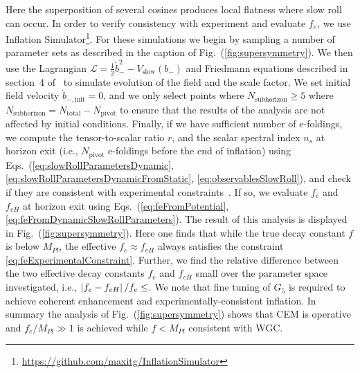 \documentclass[12pt]{article}
\begin{document}
Here the superposition of several cosines produces local flatness where slow roll can occur.
In order to verify consistency with experiment and evaluate $f_e$, we use Inflation Simulator\footnote{\url{https://github.com/maxitg/InflationSimulator}}.
For these simulations we begin by sampling a number of parameter sets as described in the caption of Fig.~(\ref{fig:supersymmetry}).
We then use the Lagrangian $\mathcal{L} = \frac{1}{2} \dot b_-^2 - V_\text{slow}\left(b_-\right)$ and Friedmann equations described in section~4 of~\cite{Nath:2018xxe} to simulate evolution of the field and the scale factor.
We set initial field velocity $\dot b_{-, \text{init}} = 0$, and we only select points where $N_\text{subhorizon} \geq 5$ where $N_\text{subhorizon} = N_\text{total} - N_\text{pivot}$ to ensure that the results of the analysis are not affected by initial conditions.
Finally, if we have sufficient number of e-foldings, we compute the tensor-to-scalar ratio $r$, and the scalar spectral index $n_s$ at horizon exit (i.e., $N_\text{pivot}$ e-foldings before the end of inflation) using Eqs.~(\ref{eq:slowRollParametersDynamic}, \ref{eq:slowRollParametersDynamicFromStatic}, \ref{eq:observablesSlowRoll}), and check if they are consistent with experimental constraints~\cite{Akrami:2018odb}.
If so, we evaluate $f_e$ and $f_{eH}$ at horizon exit using Eqs.~(\ref{eq:feFromPotential}, \ref{eq:feFromDynamicSlowRollParameters}).
The result of this analysis is displayed in Fig.~(\ref{fig:supersymmetry}).
Here one finds that while the true decay constant $f$ is below $M_{Pl}$, the effective $f_e \approx f_{eH}$ always satisfies the constraint \ref{eq:feExperimentalConstraint}.
Further, we find the relative difference between the two effective decay constants $f_e$ and $f_{eH}$ small over the parameter space investigated, i.e., $\left|f_e - f_{eH}\right| / f_e \le \protect$.
We note that fine tuning of $G_5$ is required to achieve coherent enhancement and experimentally-consistent inflation.
In summary the analysis of Fig.~(\ref{fig:supersymmetry}) shows that CEM is operative and $f_e / M_{Pl} \gg 1$ is achieved while $f < M_{Pl}$ consistent with WGC.
\end{document}
